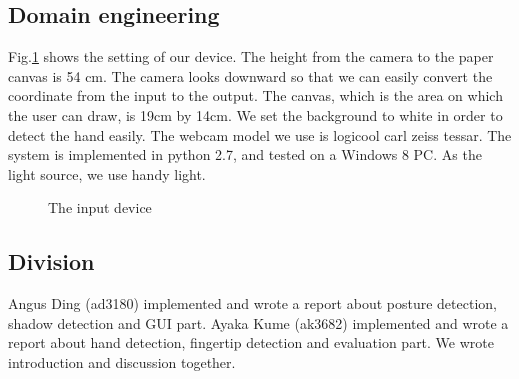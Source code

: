 \subsection{Domain engineering}
Fig.\ref{fig:1} shows the setting of our device. The height from the camera to the paper canvas is 54 cm. The camera looks downward so that we can easily convert the coordinate from the input to the output. The canvas, which is the area on which the user can draw, is 19cm by 14cm. We set the  background to white in order to detect the hand easily. The webcam model we use is logicool carl zeiss tessar. The system is implemented in python 2.7, and tested on a Windows 8 PC. As the light source, we use handy light. 
\begin{figure}
  \centering
 
 \caption{The input device}
 \label{fig:1}
\end{figure}
\subsection{Division}
Angus Ding (ad3180) implemented and wrote a report about posture detection, shadow detection and GUI part.
Ayaka Kume (ak3682) implemented and wrote a report about hand detection, fingertip detection and evaluation part.
We wrote introduction and discussion together.
\clearpage
\clearpage
